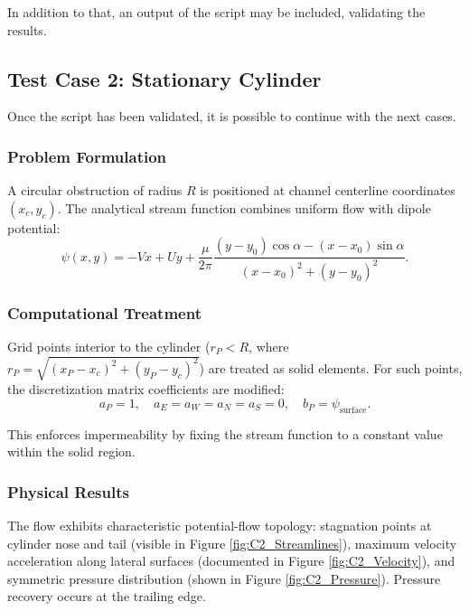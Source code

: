 In addition to that, an output of the script may be included, validating the results.



\subsection{Test Case 2: Stationary Cylinder}
Once the script has been validated, it is possible to continue with the next cases.

\subsubsection{Problem Formulation}

A circular obstruction of radius $R$ is positioned at channel centerline coordinates $(x_c, y_c)$. The analytical stream function combines uniform flow with dipole potential:
\begin{equation}
\psi(x, y) = -Vx + Uy + \frac{\mu}{2\pi}
\frac{(y - y_0)\cos\alpha - (x - x_0)\sin\alpha}{(x - x_0)^2 + (y - y_0)^2}.
\end{equation}

\subsubsection{Computational Treatment}

Grid points interior to the cylinder ($r_P < R$, where $r_P = \sqrt{(x_P - x_c)^2 + (y_P - y_c)^2}$) are treated as solid elements. For such points, the discretization matrix coefficients are modified:
\begin{equation}
a_P = 1, \quad a_E = a_W = a_N = a_S = 0, \quad b_P = \psi_{\text{surface}}.
\end{equation}

This enforces impermeability by fixing the stream function to a constant value within the solid region.

\subsubsection{Physical Results}

The flow exhibits characteristic potential-flow topology: stagnation points at cylinder nose and tail (visible in Figure \ref{fig:C2_Streamlines}), maximum velocity acceleration along lateral surfaces (documented in Figure \ref{fig:C2_Velocity}), and symmetric pressure distribution (shown in Figure \ref{fig:C2_Pressure}). Pressure recovery occurs at the trailing edge.

